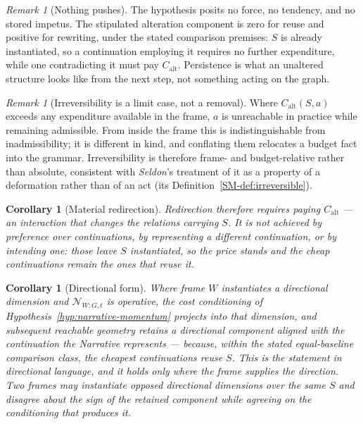 \documentclass[11pt,a4paper]{article}
\newtheorem{corollary}[definition]{Corollary}
\theoremstyle{remark}
\newtheorem{remark}[definition]{Remark}
\newcommand{\Narr}{\mathcal N}
\begin{document}
\begin{remark}[Nothing pushes]\label{rem:nothing-pushes}
The hypothesis posits no force, no tendency, and no stored impetus. The stipulated alteration component is zero for reuse and positive for rewriting, under the stated comparison premises: $S$ is already instantiated, so a continuation employing it requires no further expenditure, while one contradicting it must pay $C_{\mathrm{alt}}$. Persistence is what an unaltered structure looks like from the next step, not something acting on the graph.
\end{remark}

\begin{remark}[Irreversibility is a limit case, not a removal]\label{rem:irreversibility}
Where $C_{\mathrm{alt}}(S,a)$ exceeds any expenditure available in the frame, $a$ is unreachable in practice while remaining admissible. From inside the frame this is indistinguishable from inadmissibility; it is different in kind, and conflating them relocates a budget fact into the grammar. Irreversibility is therefore frame- and budget-relative rather than absolute, consistent with \emph{Seldon}'s treatment of it as a property of a deformation rather than of an act (its Definition~\ref{SM-def:irreversible}).
\end{remark}

\begin{corollary}[Material redirection]\label{cor:redirection}
Redirection therefore requires paying $C_{\mathrm{alt}}$ --- an interaction that changes the relations carrying $S$. It is not achieved by preference over continuations, by representing a different continuation, or by intending one: those leave $S$ instantiated, so the price stands and the cheap continuations remain the ones that reuse it.
\end{corollary}

\begin{corollary}[Directional form]\label{cor:directional}
Where frame $W$ instantiates a directional dimension and $\Narr_{W:G,t}$ is operative, the cost conditioning of Hypothesis~\ref{hyp:narrative-momentum} projects into that dimension, and subsequent reachable geometry retains a directional component aligned with the continuation the Narrative represents --- because, within the stated equal-baseline comparison class, the cheapest continuations reuse $S$. This is the statement in directional language, and it holds only where the frame supplies the direction. Two frames may instantiate opposed directional dimensions over the same $S$ and disagree about the sign of the retained component while agreeing on the conditioning that produces it.
\end{corollary}
\end{document}
